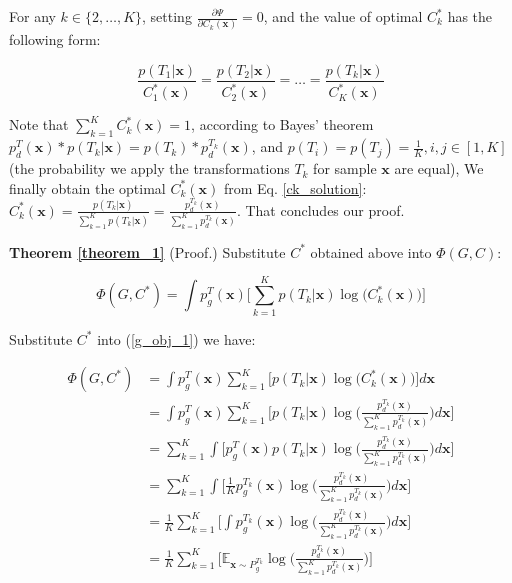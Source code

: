 \documentclass{article}
\begin{document}
For any $k \in \{2, \dots, K\}$, setting $\frac{\partial\Psi}{\partial C_k(\mathbf{x})} = 0$, and the value of optimal $C_k^*$ has the following form:

\begin{equation}
\frac{p({T_1}|\mathbf{x})}{C^*_1(\mathbf{x})} = \frac{p({T_2}|\mathbf{x})}{C^*_2(\mathbf{x})} = \dots = \frac{p({T_k}|\mathbf{x})}{C^*_K(\mathbf{x})}
\label{ck_solution}
\end{equation}

Note that $\sum_{k=1}^{K}C^*_k(\mathbf{x}) = 1$, according to Bayes' theorem $p_d^T(\mathbf{x}) * p({T_k}|\mathbf{x}) = p(T_k) * p_d^{T_k}(\mathbf{x})$, and $p(T_i) = p(T_j) = \frac{1}{K}, i,j \in [1, K]$ (the probability we apply the transformations $T_k$ for sample $\mathbf{x}$ are equal), We finally obtain the optimal $C_k^*(\mathbf{x})$ from Eq. \ref{ck_solution}: $C^*_k(\mathbf{x}) = \frac{p({T_k}|\mathbf{x})}{\sum_{k=1}^{K}p({T_k}|\mathbf{x})} = \frac{p_d^{T_k}(\mathbf{x})}{\sum_{k=1}^{K}p_d^{T_k}(\mathbf{x})}$. That concludes our proof.

\noindent \textbf{Theorem \ref{theorem_1}} (Proof.) Substitute $C^*$ obtained above into $\Phi(G, C)$:

\begin{equation}
\Phi(G, C^*) = \int p_g^{T}(\mathbf{x})\bigg[\sum_{k=1}^{K}p({T_k}|\mathbf{x})\log\Big(C^*_k(\mathbf{x})\Big)\bigg]
\label{g_obj_1}
\end{equation}

Substitute  $C^*$ into (\ref{g_obj_1}) we have: 

\begin{equation}
\begin{split}
\Phi(G, C^*) &= \int p_g^{T}(\mathbf{x}) \sum_{k=1}^{K}\bigg[p({T_k}|\mathbf{x})\log\Big(C^*_k(\mathbf{x})\Big)\bigg]d\mathbf{x}\\
   &= \int p_g^{T}(\mathbf{x}) \sum_{k=1}^{K}\bigg[p({T_k}|\mathbf{x})\log\Big(\frac{p_d^{T_k}(\mathbf{x})}{\sum_{k=1}^{K}p_d^{T_k}(\mathbf{x})}\Big)d\mathbf{x}\bigg]\\
   &= \sum_{k=1}^{K}\int \bigg[p_g^{T}(\mathbf{x})p({T_k}|\mathbf{x})\log\Big(\frac{p_d^{T_k}(\mathbf{x})}{\sum_{k=1}^{K}p_d^{T_k}(\mathbf{x})}\Big)d\mathbf{x}\bigg]\\
   &= \sum_{k=1}^{K}\int \bigg[\frac{1}{K}p_g^{T_k}(\mathbf{x})\log\Big(\frac{p_d^{T_k}(\mathbf{x})}{\sum_{k=1}^{K}p_d^{T_k}(\mathbf{x})}\Big)d\mathbf{x}\bigg]\\
   &= \frac{1}{K}\sum_{k=1}^{K}\bigg[\int p_g^{T_k}(\mathbf{x})\log\Big(\frac{p_d^{T_k}(\mathbf{x})}{\sum_{k=1}^{K}p_d^{T_k}(\mathbf{x})}\Big)d\mathbf{x}\bigg]\\
   &= \frac{1}{K}\sum_{k=1}^{K}\bigg[\mathbb{E}_{\mathbf{x} \sim {P_g^{T_k}}}\log\Big(\frac{p_d^{T_k}(\mathbf{x})}{\sum_{k=1}^{K}p_d^{T_k}(\mathbf{x})}\Big)\bigg]
\end{split}
\label{g_obj_ss}
\end{equation}
\end{document}
